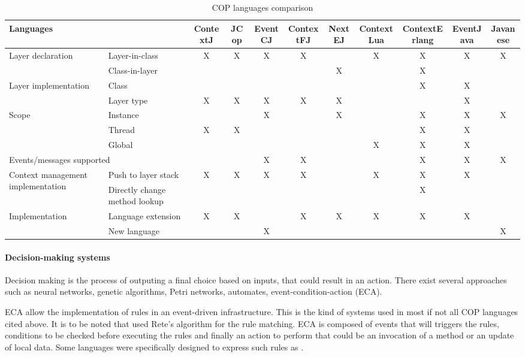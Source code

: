 \documentclass[a4paper]{article}
\begin{document}
\begin{landscape}
  \begin{table}

  \begin{tabular}{p{3cm} p{2.5cm} c c c c c c c c c }
  \hline
  \multicolumn{2}{l}{Languages} & ContextJ & JCop & EventCJ & ContextFJ & NextEJ & ContextLua & ContextErlang & EventJava & Javanese \\
  \hline
  \multirow{2}{*}{Layer declaration} & Layer-in-class & X & X & X & X & & X & X & X & X \\
    & Class-in-layer & & & & & X & & X & & \\
  \hline
  \multirow{2}{*}{Layer implementation} & Class & & & & & & & X & X \\
    & Layer type & X & X & X & X & X & & & X \\    
  \hline  
  \multirow{3}{*}{Scope} & Instance & & & X & & X & & X & X & X \\
    & Thread & X & X & & & & & X & X \\
    & Global & & & & & & X & X & X \\
  \hline
  \multicolumn{2}{l}{\multirow{1}{*}{Events/messages supported}} & & & X & X & & & X & X & X \\
  \hline
  \multirow{2}{*}{Context management implementation} & Push to layer stack & X & X & X & X & & X & X & X \\
    & Directly change method lookup & & & & & & & X \\
  \hline    
  \multirow{3}{*}{Implementation} & Language extension & X & X & & X & X & X & X & X \\
    & New language & & & X & & & & & & X \\
  \end{tabular}
  \caption{COP languages comparison}
  \end{table}
\end{landscape}




\paragraph{Decision-making systems}
Decision making is the process of outputing a final choice based on inputs, that could result in an action. There exist several approaches such as neural networks, genetic algorithms, Petri networks, automates, event-condition-action (ECA).

ECA allow the implementation of rules in an event-driven infrastructure. This is the kind of systems used in most if not all COP languages cited above. It is to be noted that \cite{jayaram_context-oriented_2009} used Rete's algorithm for the rule matching. ECA is composed of events that will triggers the rules, conditions to be checked before executing the rules and finally an action to perform that could be an invocation of a method or an update of local data. Some languages were specifically designed to express such rules as \cite{alferes_event-condition-action_2006}.
\end{document}
